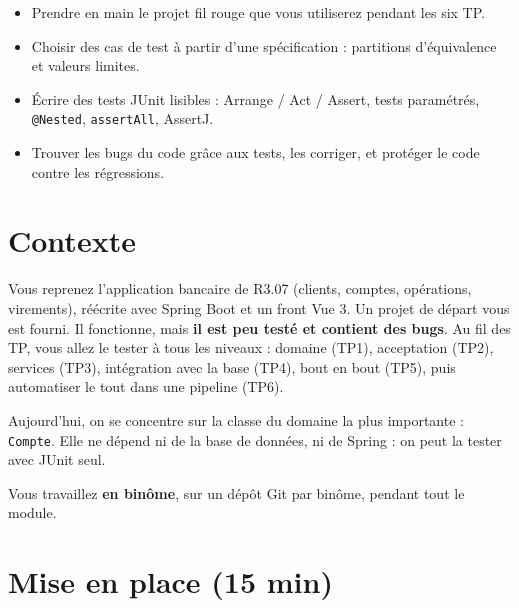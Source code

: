 \documentclass[11pt]{article}
\begin{document}

\begin{infobox}[Objectifs]
\begin{itemize}[leftmargin=1.2em, itemsep=1pt]
  \item Prendre en main le projet fil rouge que vous utiliserez pendant les six TP.
  \item Choisir des cas de test à partir d'une spécification : partitions d'équivalence et valeurs limites.
  \item Écrire des tests JUnit lisibles : Arrange / Act / Assert, tests paramétrés, \texttt{@Nested}, \texttt{assertAll}, AssertJ.
  \item Trouver les bugs du code grâce aux tests, les corriger, et protéger le code contre les régressions.
\end{itemize}
\end{infobox}

\section*{Contexte}

Vous reprenez l'application bancaire de R3.07 (clients, comptes, opérations, virements), réécrite avec Spring Boot et un front Vue 3. Un projet de départ vous est fourni. Il fonctionne, mais \textbf{il est peu testé et contient des bugs}. Au fil des TP, vous allez le tester à tous les niveaux : domaine (TP1), acceptation (TP2), services (TP3), intégration avec la base (TP4), bout en bout (TP5), puis automatiser le tout dans une pipeline (TP6).

Aujourd'hui, on se concentre sur la classe du domaine la plus importante : \texttt{Compte}. Elle ne dépend ni de la base de données, ni de Spring : on peut la tester avec JUnit seul.

Vous travaillez \textbf{en binôme}, sur un dépôt Git par binôme, pendant tout le module.

\section{Mise en place (15 min)}
\end{document}
